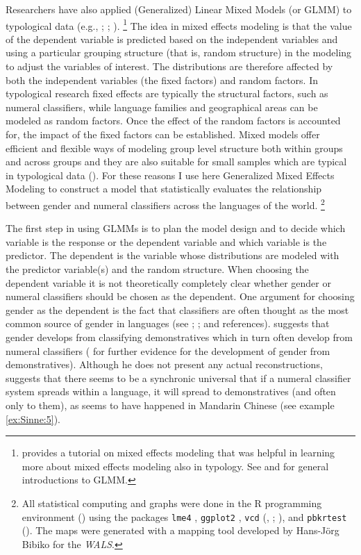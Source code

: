 \documentclass[output=collectionpaper]{langsci/langscibook}
\begin{document}
Researchers have also applied (Generalized) Linear Mixed Models (or GLMM) to typological data (e.g., \citealt{Cysouw2010}; \citealt{Jaeger2011}; \citealt{Bentz2013}).%
\footnote{\citet{Winter2013} provides a tutorial on mixed effects modeling that was helpful in learning more about mixed effects modeling also in typology. See \citet{Breslow1993} and \citet{Gelman2007} for general introductions to GLMM.} %
The idea in mixed effects modeling is that the value of the dependent variable is predicted based on the independent variables and using a particular grouping structure (that is, random structure) in the modeling to adjust the variables of interest. The distributions are therefore affected by both the independent variables (the fixed factors) and random factors. In typological research fixed effects are typically the structural factors, such as numeral classifiers, while language families and geographical areas can be modeled as random factors. Once the effect of the random factors is accounted for, the impact of the fixed factors can be established. Mixed models offer efficient and flexible ways of modeling group level structure both within groups and across groups and they are also suitable for small samples which are typical in typological data (\citealt[289--290]{Jaeger2011}). For these reasons I use here Generalized Mixed Effects Modeling to construct a model that statistically evaluates the relationship between gender and numeral classifiers across the languages of the world.%
\footnote{All statistical computing and graphs were done in the R programming environment (\citealt{RCT2017}) using the packages \texttt{lme4} \citep{Bates2015}, \texttt{ggplot2} \citep{Wickham2009}, \texttt{vcd} (\citealt{Meyer2006}, \citealt*{Meyer2015}; \citealt{Zeileis2007}), and \texttt{pbkrtest} (\citealt{Halekoh2014}). The maps were generated with a mapping tool developed by Hans-Jörg Bibiko for the \textit{WALS}.}

The first step in using GLMMs is to plan the model design and to decide which variable is the response or the dependent variable and which variable is the predictor. The dependent is the variable whose distributions are modeled with the predictor variable(s) and the random structure. When choosing the dependent variable it is not theoretically completely clear whether gender or numeral classifiers should be chosen as the dependent. One argument for choosing gender as the dependent is the fact that classifiers are often thought as the most common source of gender in languages (see \citealt[136]{Corbett1991}; \citealt[727--728]{Seifart2010}; \citealt[450--452]{Luraghi2011} and references). \citet[78--79]{Greenberg1978} suggests that gender develops from classifying demonstratives which in turn often develop from numeral classifiers (\citealt[341--342]{Harris1995} for further evidence for the development of gender from demonstratives). Although he does not present any actual reconstructions, \citet[35--36]{Greenberg1972} suggests that there seems to be a synchronic universal that if a numeral classifier system spreads within a language, it will spread to demonstratives (and often only to them), as seems to have happened in Mandarin Chinese (see example \ref{ex:Sinne:5}).
\end{document}
